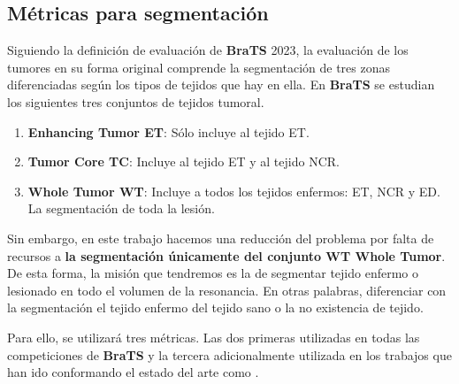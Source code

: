 \subsection{Métricas para segmentación}

Siguiendo la definición de evaluación de \textbf{BraTS} 2023, la evaluación de los tumores en su forma original comprende la segmentación de tres zonas diferenciadas según los tipos de tejidos que hay en ella. En \textbf{BraTS} se estudian los siguientes tres conjuntos de tejidos tumoral.

\begin{enumerate}
	\item \textbf{Enhancing Tumor ET}: Sólo incluye al tejido ET.
	\item \textbf{Tumor Core TC}: Incluye al tejido ET y al tejido NCR.
	\item \textbf{Whole Tumor WT}: Incluye a todos los tejidos enfermos: ET, NCR y ED. La segmentación de toda la lesión.
\end{enumerate}

Sin embargo, en este trabajo hacemos una reducción del problema por falta de recursos a \textbf{la segmentación únicamente del conjunto WT Whole Tumor}. De esta forma, la misión que tendremos es la de segmentar tejido enfermo o lesionado en todo el volumen de la resonancia. En otras palabras, diferenciar con la segmentación el tejido enfermo del tejido sano o la no existencia de tejido.

Para ello, se utilizará tres métricas. Las dos primeras utilizadas en todas las competiciones de \textbf{BraTS} y la tercera adicionalmente utilizada en los trabajos que han ido conformando el estado del arte como \cite{zhou2021latent}.

